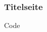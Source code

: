 \begin{frame}
    \frametitle{Titelseite}
    \begin{block}{Code}
        
    \end{block}
\end{frame}
